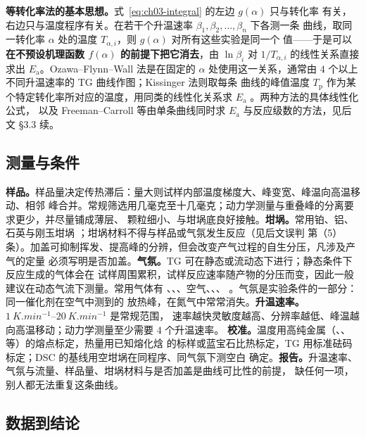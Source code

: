 \textbf{等转化率法的基本思想。}式~\eqref{eq:ch03-integral} 的左边 $g(\alpha)$ 只与转化率
有关，右边只与温度程序有关。在若干个升温速率 $\beta_1,\beta_2,\dots,\beta_n$ 下各测一条
曲线，取同一转化率 $\alpha$ 处的温度 $T_{\alpha,i}$，则 $g(\alpha)$ 对所有这些实验是同一个
值——于是可以\textbf{在不预设机理函数 $f(\alpha)$ 的前提下把它消去}，由 $\ln\beta_i$ 对
$1/T_{\alpha,i}$ 的线性关系直接求出 $E_{\mathrm{a}}$。Ozawa--Flynn--Wall 法是在固定的
$\alpha$ 处使用这一关系，通常由 $4$ 个以上不同升温速率的 TG 曲线作图；Kissinger 法则取每条
曲线的峰值温度 $T_{\mathrm{p}}$ 作为某个特定转化率所对应的温度，用同类的线性化关系求
$E_{\mathrm{a}}$ 。两种方法的具体线性化公式，
以及 Freeman--Carroll 等由单条曲线同时求 $E_{\mathrm{a}}$ 与反应级数的方法，见后文 §3.3 续。

\subsection{测量与条件}

\begin{measure}
\textbf{样品。}样品量决定传热滞后：量大则试样内部温度梯度大、峰变宽、峰温向高温移动、相邻
峰合并。常规筛选用几毫克至十几毫克；动力学测量与重叠峰的分离要求更少，并尽量铺成薄层、
颗粒细小、与坩埚底良好接触。\textbf{坩埚。}常用铂、铝、石英与刚玉坩埚
；坩埚材料不得与样品或气氛发生反应（见后文误判
第（5）条）。加盖可抑制挥发、提高峰的分辨，但会改变产气过程的自生分压，凡涉及产气的定量
必须写明是否加盖。\textbf{气氛。}TG 可在静态或流动态下进行；静态条件下反应生成的气体会在
试样周围累积，试样反应速率随产物的分压而变，因此一般建议在动态气流下测量。常用气体有
、、、空气、、、
。气氛是实验条件的一部分：同一催化剂在空气中测到的
放热峰，在氮气中常常消失。\textbf{升温速率。}$\qtyrange{1}{20}{K.min^{-1}}$ 是常规范围，
速率越快灵敏度越高、分辨率越低、峰温越向高温移动；动力学测量至少需要 $4$ 个升温速率。
\textbf{校准。}温度用高纯金属（、、 等）的熔点标定，热量用已知熔化焓
的标样或蓝宝石比热标定，TG 用标准砝码标定；DSC 的基线用空坩埚在同程序、同气氛下测空白
确定。\textbf{报告。}升温速率、气氛与流量、样品量、坩埚材料与是否加盖是曲线可比性的前提，
缺任何一项，别人都无法重复这条曲线。
\end{measure}

\subsection{数据到结论}

